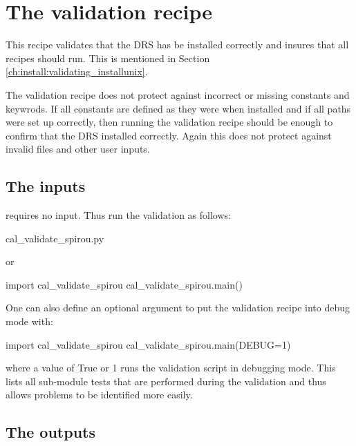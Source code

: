 \clearpage
\newpage
\section{The validation recipe}
\label{ch:the_recipes:cal_validate_spirou}

This recipe validates that the DRS has be installed correctly and insures that all recipes should run. This is mentioned in Section \ref{ch:install:validating_installunix}.
\begin{note}
The validation recipe does not protect against incorrect or missing constants and keywrods. If all constants are defined as they were when installed and if all paths were set up correctly, then running the validation recipe should be enough to confirm that the DRS installed correctly. Again this does not protect against invalid files and other user inputs.
\end{note}

\subsection{The inputs}
\calvalidate requires no input. Thus run the validation as follows:
\begin{cmdbox}
cal_validate_spirou.py
\end{cmdbox}
\noindent or
\begin{pythonbox}
import cal_validate_spirou
cal_validate_spirou.main()
\end{pythonbox}
\noindent One can also define an optional argument to put the validation recipe into debug mode with:
\begin{pythonbox}
import cal_validate_spirou
cal_validate_spirou.main(DEBUG=1)
\end{pythonbox}
\noindent where a value of True or 1 runs the validation script in debugging mode. This lists all sub-module tests that are performed during the validation and thus allows problems to be identified more easily.

\subsection{The outputs}

